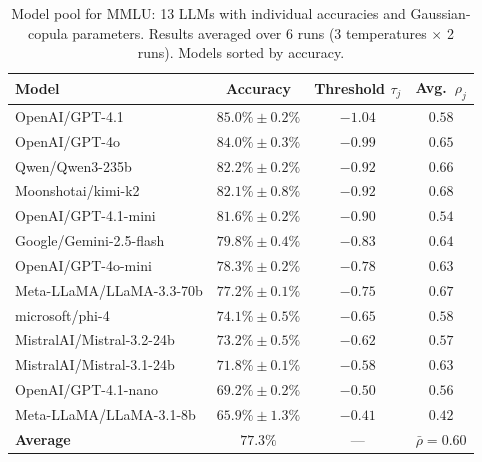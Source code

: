 \documentclass{article}
\theoremstyle{plain}
\theoremstyle{definition}
\theoremstyle{remark}
\begin{document}
\begin{table}[ht]
\centering
\caption{Model pool for MMLU: 13 LLMs with individual accuracies and Gaussian-copula parameters. Results averaged over 6 runs (3 temperatures $\times$ 2 runs). Models sorted by accuracy.}
\label{tab:mmlu_models}
\small
\begin{tabular}{lccc}
\toprule
\textbf{Model} & \textbf{Accuracy} & \textbf{Threshold $\tau_j$} & \textbf{Avg.\ $\rho_j$} \\
\midrule
OpenAI/GPT-4.1             & $85.0\% \pm 0.2\%$ & $-1.04$ & $0.58$ \\
OpenAI/GPT-4o              & $84.0\% \pm 0.3\%$ & $-0.99$ & $0.65$ \\
Qwen/Qwen3-235b            & $82.2\% \pm 0.2\%$ & $-0.92$ & $0.66$ \\
Moonshotai/kimi-k2         & $82.1\% \pm 0.8\%$ & $-0.92$ & $0.68$ \\
OpenAI/GPT-4.1-mini        & $81.6\% \pm 0.2\%$ & $-0.90$ & $0.54$ \\
Google/Gemini-2.5-flash    & $79.8\% \pm 0.4\%$ & $-0.83$ & $0.64$ \\
OpenAI/GPT-4o-mini         & $78.3\% \pm 0.2\%$ & $-0.78$ & $0.63$ \\
Meta-LLaMA/LLaMA-3.3-70b   & $77.2\% \pm 0.1\%$ & $-0.75$ & $0.67$ \\
microsoft/phi-4            & $74.1\% \pm 0.5\%$ & $-0.65$ & $0.58$ \\
MistralAI/Mistral-3.2-24b  & $73.2\% \pm 0.5\%$ & $-0.62$ & $0.57$ \\
MistralAI/Mistral-3.1-24b  & $71.8\% \pm 0.1\%$ & $-0.58$ & $0.63$ \\
OpenAI/GPT-4.1-nano        & $69.2\% \pm 0.2\%$ & $-0.50$ & $0.56$ \\
Meta-LLaMA/LLaMA-3.1-8b    & $65.9\% \pm 1.3\%$ & $-0.41$ & $0.42$ \\
\midrule
\textbf{Average} & $77.3\%$ & --- & $\bar{\rho} = 0.60$ \\
\bottomrule
\end{tabular}
\end{table}
\end{document}
